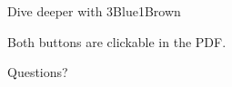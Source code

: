 \documentclass[aspectratio=169]{beamer}
\begin{document}
\begin{frame}{Dive deeper with 3Blue1Brown}
  \vfill
  \begin{center}
    \href{https://www.youtube.com/watch?v=LPZh9BOjkQs}{%
      }
    \hspace{0.7em}
    \href{https://www.youtube.com/playlist?list=PLZHQObOWTQDNU6R1_67000Dx_ZCJB-3pi}{%
      }

    \medskip
    \scriptsize
    Both buttons are clickable in the PDF\@.
  \end{center}
\end{frame}

\begin{frame}[plain]
  \centering
  \Huge Questions?
\end{frame}
\end{document}

